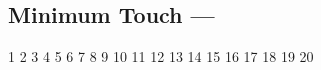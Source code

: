 \subsection[Minimum Touch]{Minimum Touch --- \UiKey{\I}\UiKey{\SET}}










































1
2
3
4
5
6
7
8
9
10
11
12
13
14
15
16
17
18
19
20
